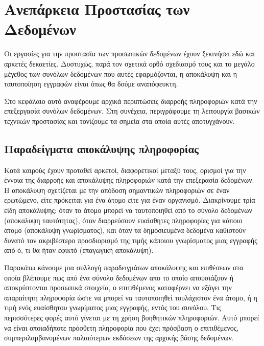 \chapter{Ανεπάρκεια Προστασίας των Δεδομένων}

Οι εργασίες για την προστασία των προσωπικών δεδομένων έχουν ξεκινήσει εδώ και αρκετές δεκαετίες. Δυστυχώς, παρά τον σχετικά ορθό σχεδιασμό τους και το μεγάλο μέγεθος των συνόλων δεδομένων που αυτές εφαρμόζονται, η αποκάλυψη και η ταυτοποίηση εγγραφών είναι όπως θα δούμε αναπόφευκτη. 

Στο κεφάλαιο αυτό αναφέρουμε αρχικά περιπτώσεις διαρροής πληροφοριών κατά την επεξεργασία συνόλων δεδομένων. Στη συνέχεια, περιγράφουμε τη λειτουργία βασικών τεχνικών προστασίας και τονίζουμε τα σημεία στα οποία αυτές αποτυγχάνουν.



\section{Παραδείγματα αποκάλυψης πληροφορίας}

Κατά καιρούς έχουν προταθεί αρκετοί, διαφορετικοί μεταξύ τους, ορισμοί για την έννοια της διαρροής και αποκάλυψης πληροφοριών κατά την επεξερασία δεδομένων. 
Η αποκάλυψη σχετίζεται με την απόδοση σημαντικών πληροφοριών σε έναν ερωτώμενο, είτε πρόκειται για ένα άτομο είτε για έναν οργανισμό. Διακρίνουμε τρία είδη αποκάλυψης: όταν το άτομο μπορεί να ταυτοποιηθεί από το σύνολο δεδομένων (αποκαλυψη ταυτότητας), όταν διαρρεύσουν ευαίσθητες πληροφορίες για κάποιο άτομο (αποκάλυψη γνωρίσματος), και όταν τα δημοσιευμένα δεδομένα καθιστούν δυνατό τον ακριβέστερο προσδιορισμό της τιμής κάποιου γνωρίσματος μιας εγγραφής από ό, τι θα ήταν εφικτό (επαγωγική αποκάλυψη).


Παρακάτω κάνουμε μια συλλογή παραδειγμάτων αποκάλυψης και επιθέσεων στα οποία βλέπουμε πως από ένα σύνολο δεδομένων απο το οποίο απουσιάζουν ή αποκρύπτονται προσωπικά στοιχεία, ο επιτιθέμενος καταφέρνει να εξάγει την απαραίτητη πληροφορία ώστε να μπορεί να ταυτοποιηθεί τουλάχιστον ένα άτομο, ή η τιμή ενός ευαίσθητου γνωρίματος μιας εγγραφής, εντός του συνόλου. Τις περισσότερες φορές αυτό γίνεται με τη χρήση βοηθητικών πληροφοριών. Αυτό μπορεί να είναι οποιαδήποτε πρόσθετη πληροφορία που έχει πρόσβαση ο επιτιθέμενος, συμπεριλαμβανομένων παλαιότερων εκδόσεων της αρχικής βάσης δεδομένων. 


